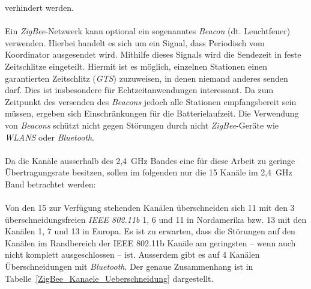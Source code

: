                 verhindert werden.\\
                \\
                Ein \emph{ZigBee}-Netzwerk kann optional ein sogenanntes \emph{Beacon} (dt. Leuchtfeuer) verwenden. Hierbei
                handelt es sich um ein Signal, dass Periodisch vom Koordinator ausgesendet wird. Mithilfe
                dieses Signals wird die Sendezeit in feste Zeitschlitze eingeteilt. Hiermit ist es möglich, 
                einzelnen Stationen einen garantierten Zeitschlitz (\emph{GTS}) zuzuweisen, in denen niemand anderes
                senden darf. Dies ist insbesondere für Echtzeitanwendungen interessant. Da zum Zeitpunkt des
                versenden des \emph{Beacons} jedoch alle Stationen empfangsbereit sein müssen, ergeben sich 
                Einschränkungen für die Batterielaufzeit. Die Verwendung von \emph{Beacons} schützt nicht gegen
                Störungen durch nicht \emph{ZigBee}-Geräte wie \emph{WLANS} oder \emph{Bluetooth}.\\
                \\
                Da die Kanäle ausserhalb des 2,4~GHz Bandes eine für diese Arbeit zu geringe Übertragungsrate
                besitzen, sollen im folgenden nur die 15 Kanäle im 2,4~GHz Band betrachtet werden:\\
                \\
                Von den 15 zur Verfügung stehenden Kanälen überschneiden sich 11 mit den 3 überschneidungsfreien 
                \emph{IEEE 802.11b} 1, 6 und 11 in Nordamerika bzw. 13 mit den Kanälen 1, 7 und 13 in Europa. Es ist zu 
                erwarten, dass die Störungen auf den Kanälen im Randbereich der IEEE 802.11b Kanäle am geringsten --
                wenn auch nicht komplett ausgeschlossen -- ist.
                Ausserdem gibt es auf 4 Kanälen Überschneidungen mit \emph{Bluetooth}. Der genaue Zusammenhang ist
                in Tabelle~\ref{ZigBee_Kanaele_Ueberschneidung} dargestellt.

